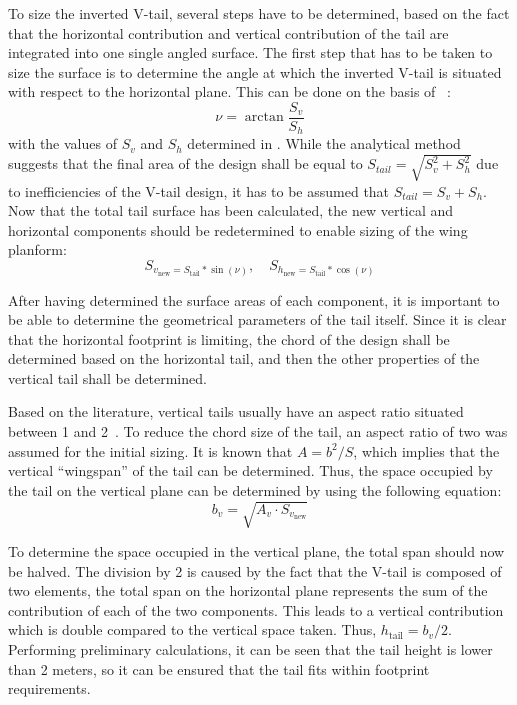 To size the inverted V-tail, several steps have to be determined, based on the fact that the horizontal contribution and vertical contribution of the tail are integrated into one single angled surface.
The first step that has to be taken to size the surface is to determine the angle at which the inverted V-tail is situated with respect to the horizontal plane.
This can be done on the basis of ~\cite{HAW_9}:
\begin{equation}
    \label{eq:V_tail_angle}
    \nu = \arctan\frac{S_v}{S_h}
\end{equation}
with the values of $S_v$ and $S_h$ determined in .
While the analytical method suggests that the final area of the design shall be equal to $S_{tail}=\sqrt{S_v^2+S_h^2}$ due to inefficiencies of the V-tail design, it has to be assumed that $S_{tail}=S_v+S_h$.
Now that the total tail surface has been calculated, the new vertical and horizontal components should be redetermined to enable sizing of the wing planform:
\begin{equation}
    S_{v_\text{new}=S_\text{tail}*\sin(\nu)},\quad S_{h_\text{new}=S_\text{tail}*\cos(\nu)}
\end{equation}

After having determined the surface areas of each component, it is important to be able to determine the geometrical parameters of the tail itself.
Since it is clear that the horizontal footprint is limiting, the chord of the design shall be determined based on the horizontal tail, and then the other properties of the vertical tail shall be determined.

Based on the literature, vertical tails usually have an aspect ratio situated between 1 and 2~\cite{Roskam_Part_2}.
To reduce the chord size of the tail, an aspect ratio of two was assumed for the initial sizing.
It is known that $A=b^2/S$, which implies that the vertical \enquote{wingspan} of the tail can be determined.
Thus, the space occupied by the tail on the vertical plane can be determined by using the following equation:
\begin{equation}
    b_v= \sqrt{A_v \cdot S_{v_\text{new}}}
\end{equation}

To determine the space occupied in the vertical plane, the total span should now be halved.
The division by 2 is caused by the fact that the V-tail is composed of two elements, the total span on the horizontal plane represents the sum of the contribution of each of the two components.
This leads to a vertical contribution which is double compared to the vertical space taken.
Thus, $h_\text{tail}=b_v/2$.
Performing preliminary calculations, it can be seen that the tail height is lower than 2 meters, so it can be ensured that the tail fits within footprint requirements.

